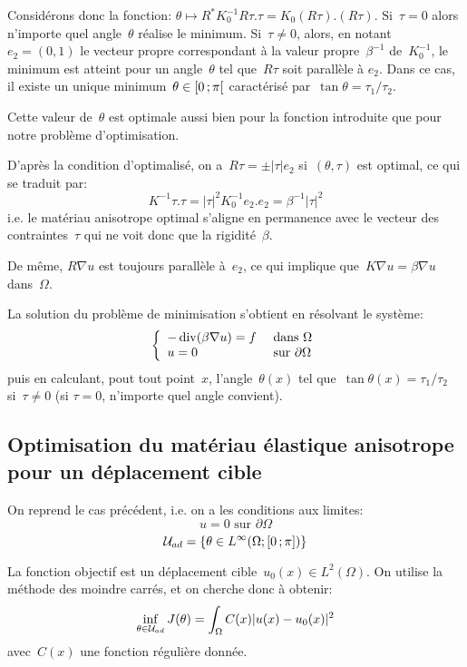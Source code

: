 Considérons donc la fonction: $\theta \mapsto R^*K_0^{-1}R\tau.\tau=K_0(R\tau).(R\tau)$.
Si~$\tau=0$ alors n'importe quel angle~$\theta$ réalise le minimum.
Si~$\tau\ne0$, alors, en notant~$e_2=(0,1)$ le vecteur propre correspondant à la valeur propre~$\beta^{-1}$ de~$K_0^{-1}$, le minimum est atteint pour un angle~$\theta$ tel que~$R\tau$ soit parallèle à $e_2$. Dans ce cas, il existe un unique minimum~$\theta\in\mathopen{[}0\,;\pi\mathclose{[}$ caractérisé par~$\tan\theta=\tau_1/\tau_2$.

Cette valeur de~$\theta$ est optimale aussi bien pour la fonction introduite que pour notre problème d'optimisation.

\medskip
D'après la condition d'optimalisé, on a~$R\tau=\pm|\tau|e_2$ si~$(\theta,\tau)$ est optimal, ce qui se traduit par:
\[ K^{-1}\tau.\tau = |\tau|^2K_0^{-1}e_2.e_2=\beta^{-1}|\tau|^2 \]
i.e. le matériau anisotrope optimal s'aligne en permanence avec le vecteur des contraintes~$\tau$ qui ne voit donc que la rigidité~$\beta$.

De même, $R\nabla u$ est toujours parallèle à~$e_2$, ce qui implique que~$K\nabla u=\beta\nabla u$ dans~$\Omega$.

La solution du problème de minimisation s'obtient en résolvant le système:
\[\left\{\begin{array}{ll} -\operatorname{div}(\beta\nabla u)=f &\text{ dans }\Omega\\ u=0&\text{ sur }\partial\Omega \end{array}\right. \]
puis en calculant, pout tout point~$x$, l'angle~$\theta(x)$ tel que~$\tan\theta(x)=\tau_1/\tau_2$ si~$\tau\ne0$ (si $\tau=0$, n'importe quel angle convient).


\medskip
\subsection{Optimisation du matériau élastique anisotrope pour un déplacement cible}

On reprend le cas précédent, i.e. on a les conditions aux limites:
\[ u=0 \text{ sur }\partial\Omega \]
\[ \mathcal{U}_{ad}=\{\theta\in L^\infty(\Omega;\mathopen{[}0\,;\pi\mathclose{]}) \} \]

La fonction objectif est un déplacement cible~$u_0(x)\in L^2(\Omega)$. On utilise la méthode des moindre carrés, et on cherche donc à obtenir:
\[ \colorblue \inf_{\theta\in\mathcal{U}_{ad}} J(\theta)=\dint_\Omega C(x)|u(x)-u_0(x)|^2 \]
avec~$C(x)$ une fonction régulière donnée.

